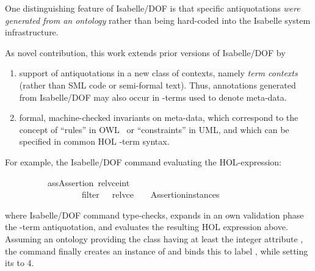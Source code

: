 \begin{isabellebody}
\begin{isamarkuptext}
One distinguishing feature of Isabelle/DOF is that specific antiquotations \emph{were generated from
an ontology} rather than being hard-coded into the Isabelle system infrastructure.
\end{isamarkuptext}\isamarkuptrue%

\begin{isamarkuptext}
As novel contribution, this work extends prior versions of Isabelle/DOF by 

%
\begin{enumerate}%
\item support of antiquotations in a new class of contexts, namely \emph{term contexts} 
(rather than SML code or semi-formal text). Thus, annotations generated
from  Isabelle/DOF may also occur in \isa{{\isasymlambda}}-terms used to denote meta-data. 

\item formal, machine-checked invariants on meta-data, which correspond to the concept of 
``rules'' in OWL~ \cite{OWL2014} or ``constraints'' in UML, and which can be specified in 
common HOL \isa{{\isasymlambda}}-term syntax.%
\end{enumerate}
\end{isamarkuptext}\isamarkuptrue%

\begin{isamarkuptext}
\noindent For example, the Isabelle/DOF command evaluating the HOL-expression:

\begin{isabelle}
\ \ \ \ \ \ \ \ \ \ ass{\isacharcolon}{\kern0pt}{\isacharcolon}{\kern0pt}Assertion{\isacharcomma}{\kern0pt}\ relvce{\isacharequal}{\kern0pt}{}{\isacharcolon}{\kern0pt}{\isacharcolon}{\kern0pt}int{\isacharbrackright}{\kern0pt}\ \isanewline
\ \ \ \ \ \ \ \ \ \ \ \ \ \ \ \ \ \ {\isacartoucheopen}filter\ {\isacharparenleft}{\kern0pt}{\isasymlambda}\ {\isasymsigma}{\isachardot}{\kern0pt}\ relvce\ {\isasymsigma}\ {\isachargreater}{\kern0pt}\ {}{\isacharparenright}{\kern0pt}\ {\isacharat}{\kern0pt}{\isacharbraceleft}{\kern0pt}Assertion{\isacharminus}{\kern0pt}instances{\isacharbraceright}{\kern0pt}{\isacartoucheclose}
\end{isabelle}
where Isabelle/DOF command  type-checks, expands in an own validation phase
the -term antiquotation, and evaluates the resulting HOL expression
above. Assuming an ontology providing the class  having at least the
integer attribute , the command finally creates an instance of  and 
binds this to label , while setting its  to 4.


\end{isamarkuptext}
\end{isabellebody}
